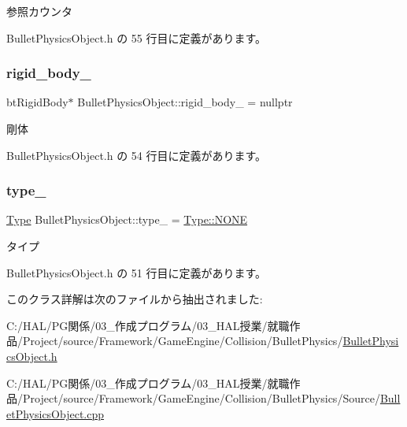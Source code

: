 参照カウンタ 



 Bullet\+Physics\+Object.\+h の 55 行目に定義があります。

\mbox{\label{class_bullet_physics_object_a95bcfe681fee31cafe9f4ddf8d17a3fd}} 
\subsubsection{\texorpdfstring{rigid\+\_\+body\+\_\+}{rigid\_body\_}}
{\footnotesize\ttfamily bt\+Rigid\+Body$\ast$ Bullet\+Physics\+Object\+::rigid\+\_\+body\+\_\+ = nullptr\hspace{0.3cm}{\ttfamily [private]}}



剛体 



 Bullet\+Physics\+Object.\+h の 54 行目に定義があります。

\mbox{\label{class_bullet_physics_object_a89ca999874ab6113c1dca6e5091db62f}} 
\subsubsection{\texorpdfstring{type\+\_\+}{type\_}}
{\footnotesize\ttfamily \mbox{\hyperlink{class_bullet_physics_object_ac428a5598df5fd4a450197e021420927}{Type}} Bullet\+Physics\+Object\+::type\+\_\+ = \mbox{\hyperlink{class_bullet_physics_object_ac428a5598df5fd4a450197e021420927ab50339a10e1de285ac99d4c3990b8693}{Type\+::\+N\+O\+NE}}\hspace{0.3cm}{\ttfamily [private]}}



タイプ 



 Bullet\+Physics\+Object.\+h の 51 行目に定義があります。



このクラス詳解は次のファイルから抽出されました\+:\begin{DoxyCompactItemize}
\item 
C\+:/\+H\+A\+L/\+P\+G関係/03\+\_\+作成プログラム/03\+\_\+\+H\+A\+L授業/就職作品/\+Project/source/\+Framework/\+Game\+Engine/\+Collision/\+Bullet\+Physics/\mbox{\hyperlink{_bullet_physics_object_8h}{Bullet\+Physics\+Object.\+h}}\item 
C\+:/\+H\+A\+L/\+P\+G関係/03\+\_\+作成プログラム/03\+\_\+\+H\+A\+L授業/就職作品/\+Project/source/\+Framework/\+Game\+Engine/\+Collision/\+Bullet\+Physics/\+Source/\mbox{\hyperlink{_bullet_physics_object_8cpp}{Bullet\+Physics\+Object.\+cpp}}\end{DoxyCompactItemize}
